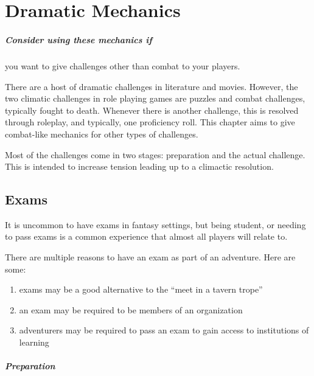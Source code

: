 \documentclass[twocolumn]{dndbook}
\begin{document}

\chapter{Dramatic Mechanics}

\begin{emphasisParagraph}
	\paragraph*{Consider using these mechanics if} you want to give challenges other than combat to your players.
\end{emphasisParagraph}

There are a host of dramatic challenges in literature and movies.
However, the two climatic challenges in role playing games are puzzles and combat challenges, typically fought to death.
Whenever there is another challenge, this is resolved through roleplay, and typically, one proficiency roll.
This chapter aims to give combat-like mechanics for other types of challenges.\par

Most of the challenges come in two stages: preparation and the actual challenge.
This is intended to increase tension leading up to a climactic resolution.\par

\section{Exams}

It is uncommon to have exams in fantasy settings, but being student, or needing to pass exams is a common experience that almost all players will relate to.\par

There are multiple reasons to have an exam as part of an adventure. Here are some:
\begin{enumerate}
    \item exams may be a good alternative to the ``meet in a tavern trope''
    \item an exam may be required to be members of an organization
    \item adventurers may be required to pass an exam to gain access to institutions of learning
\end{enumerate}


\paragraph*{Preparation}
\end{document}
